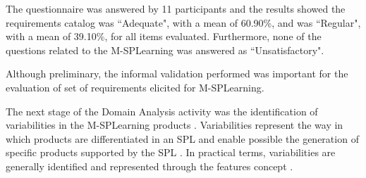 The questionnaire was answered by 11 participants and the results showed the requirements catalog was ``Adequate", with a mean of 60.90\%, and was ``Regular", with a mean of 39.10\%, for all items evaluated. Furthermore, none of the questions related to the M-SPLear\allowbreak ning was answered as ``Unsatisfactory". 

%

Although preliminary, the informal validation performed was important for the evaluation of set of requirements elicited for M-SPLear\allowbreak ning.

The next stage of the Domain Analysis activity was the identification of variabilities in the M-SPLear\allowbreak ning products \cite{krueger02}. Variabilities represent the way in which products are differentiated in an SPL and enable possible the generation of specific products supported by the SPL \cite{vangurp01}. In practical terms, variabilities are generally identified and represented through the features concept \cite{bosch01,kang90}.

